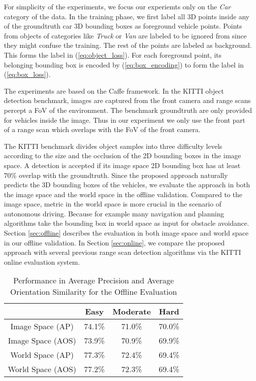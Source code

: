 \documentclass[conference]{IEEEtran}
\begin{document}
For simplicity of the experiments, we focus our experiemts only on the \textit{Car} category of the data. In the training phase, we first label all 3D points inside any of the groundtruth car 3D bounding boxes as foreground vehicle points. Points from objects of categories like \textit{Truck} or \textit{Van} are labeled to be ignored from  since they might confuse the training. The rest of the points are labeled as background. This forms the label  in (\ref{eq:object_loss}). For each foreground point, its belonging bounding box is encoded by (\ref{eq:box_encoding}) to form the label  in (\ref{eq:box_loss}).

The experiments are based on the Caffe \cite{Jia2014} framework. In the KITTI object detection benchmark, images are captured from the front camera and range scans percept a  FoV of the environment. The benchmark groundtruth are only provided for vehicles inside the image. Thus in our experiment we only use the front part of a range scan which overlaps with the FoV of the front camera.

The KITTI benchmark divides object samples into three difficulty levels according to the size and the occlusion of the 2D bounding boxes in the image space. A detection is accepted if its image space 2D bounding box has at least 70\% overlap with the groundtruth. Since the proposed approach naturally predicts the 3D bounding boxes of the vehicles, we evaluate the approach in both the image space and the world space in the offline validation. Compared to the image space, metric in the world space is more crucial in the scenario of autonomous driving. Because for example many navigation and planning algorithms take the bounding box in world space as input for obstacle avoidance. Section \ref{sec:offline} describes the evaluation in both image space and world space in our offline validation. In Section \ref{sec:online}, we compare the proposed approach with several previous range scan detection algorithms via the KITTI online evaluation system.

\begin{table}
    \centering
    \caption{Performance in Average Precision and Average Orientation Similarity for the Offline Evaluation}
    \begin{tabular}{cccc}
    \hline\hline
     & Easy & Moderate & Hard \\
    \hline
    Image Space (AP) & 74.1\% & 71.0\% & 70.0\% \\
    Image Space (AOS) & 73.9\% & 70.9\% & 69.9\%\\
    World Space (AP) & 77.3\% & 72.4\% & 69.4\% \\
    World Space (AOS) & 77.2\% & 72.3\% & 69.4\% \\
    \hline
    \end{tabular}
    \label{tab:offline}
\end{table}
\end{document}

